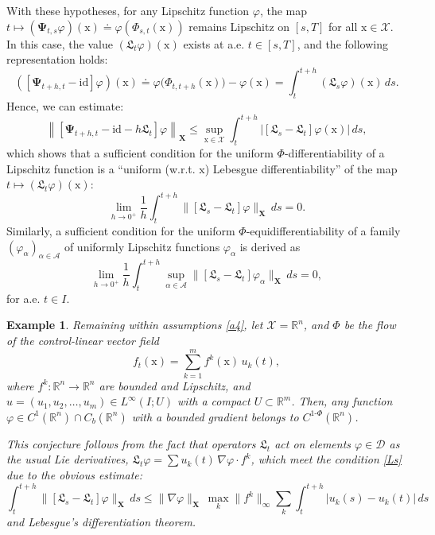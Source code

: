 \documentclass[sn-mathphys-num]{sn-jnl}
\numberwithin{equation}{section}
\theoremstyle{mythm}
\theoremstyle{mydef}
\newtheorem{example}[proposition]{Example}
\renewcommand{\phi}{\varphi}
\renewcommand{\d}{\,d}
\newcommand{\id}{\mathrm{id}}
\newcommand{\R}{\mathbb{R}}
\begin{document}
With these hypotheses, for any Lipschitz function $\phi$, the map $t \mapsto (\bm{\Psi}_{t, s} \phi)(\mathrm{x}) \doteq \phi\left(\Phi_{s, t}(\mathrm{x})\right)$ remains Lipschitz on $[s, T]$ for all $\mathrm{x} \in \mathcal{X}$. In this case, the value $({\mathfrak{L}_t{\phi}})(\mathrm{x})$ exists at a.e. $t \in [s, T]$, and the following representation holds:
\[
   \left(\left[\bm{\Psi}_{t+h, t} -\id\right]\phi\right)(\mathrm{x}) \doteq {\phi}\big(\Phi_{t, t+h}(\mathrm{x})\big) - {\phi}(\mathrm{x}) = \int_t^{t+h} ({\mathfrak{L}_s{\phi}})(\mathrm{x}) \, ds.
\]
Hence, we can estimate:
\[
    \left\|\left[\bm{\Psi}_{t+h, t}-\id - h\mathfrak{L}_t\right]\phi\right\|_{\bm{X}} \leq  \sup_{\mathrm x \in \mathcal X} \int_t^{t+h}\big|[\mathfrak{L}_s- \mathfrak{L}_t]{\phi}(\mathrm{x})\big| \, ds,
\]
which shows that a sufficient condition for the uniform $\Phi$-differentiability of a Lipschitz function is a ``uniform (w.r.t. $\mathrm{x}$) Lebesgue differentiability'' of the map $t \mapsto (\mathfrak{L}_t \phi)(\mathrm{x })$:
\begin{equation}\label{Ls}
    \lim_{h\to 0^+}\frac{1}{h}\int_t^{t+h}\big\|[\mathfrak{L}_s- \mathfrak{L}_t]{\phi}\big\|_{\bm{X}} \, ds = 0.
\end{equation}
Similarly, a sufficient condition for the uniform $\Phi$-equidifferentiability of a family $(\phi_\alpha)_{\alpha \in \mathcal{A}}$ of uniformly Lipschitz functions $\phi_\alpha$ is derived as
\begin{equation}\label{Ls-2}
    \lim_{h\to 0^+}\frac{1}{h}\int_t^{t+h}\sup_{\alpha \in \mathcal{A}}\big\|[\mathfrak{L}_s- \mathfrak{L}_t]{\phi_\alpha}\big\|_{\bm{X}} \, ds = 0,
\end{equation}
for a.e. $t\in I$.

\begin{example}\label{ex2}
Remaining within assumptions \ref{a4}, let $\mathcal X = \R^n$, and $\Phi$ be the flow of the control-linear vector field \[f_t(\mathrm x) = \sum_{k=1}^m f^k(\mathrm x) \, u_k(t),\] where $f^k\colon \R^n \to \R^n$ are bounded and Lipschitz, and $u =(u_1, u_2, \ldots, u_m) \in L^\infty(I;U)$ with a compact $U \subset \R^m$.  Then, any function $\phi \in C^1(\R^n) \cap C_b(\R^n)$ with a bounded gradient belongs to $C^{1\text{-}\Phi}(\R^n)$. 

This conjecture follows from the fact that operators $\mathfrak{L}_t$ act on elements $\phi \in \bm{\mathcal D}$ as the usual Lie derivatives, $\mathfrak{L}_t \phi = \sum u_k(t)\, \nabla \phi \cdot f^k $, which meet the condition \eqref{Ls} due to the obvious estimate:
\[
     \int_t^{t+h}\big\|[\mathfrak{L}_s- \mathfrak{L}_t]{\phi}\big\|_{\bm X} \d s \leq \|\nabla \phi\|_{\bm X}\,\max_{k}\|f^k\|_\infty \sum_k \int_t^{t+h}\big|u_k(s)- u_k(t)\big| \d s
\]
and Lebesgue's differentiation theorem.
\end{example}
\end{document}
